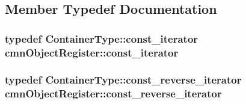 \subsection{Member Typedef Documentation}
\hypertarget{classcmn_object_register_a660d73b1be5af069a8f09606a5819d2e}{
\subsubsection[{const\-\_\-iterator}]{\setlength{\rightskip}{0pt plus 5cm}typedef Container\-Type\-::const\-\_\-iterator {\bf cmn\-Object\-Register\-::const\-\_\-iterator}}}\label{classcmn_object_register_a660d73b1be5af069a8f09606a5819d2e}
\hypertarget{classcmn_object_register_a950b9ecbe6287e932232dc5c172e5b1f}{
\subsubsection[{const\-\_\-reverse\-\_\-iterator}]{\setlength{\rightskip}{0pt plus 5cm}typedef Container\-Type\-::const\-\_\-reverse\-\_\-iterator {\bf cmn\-Object\-Register\-::const\-\_\-reverse\-\_\-iterator}}}\label{classcmn_object_register_a950b9ecbe6287e932232dc5c172e5b1f}


